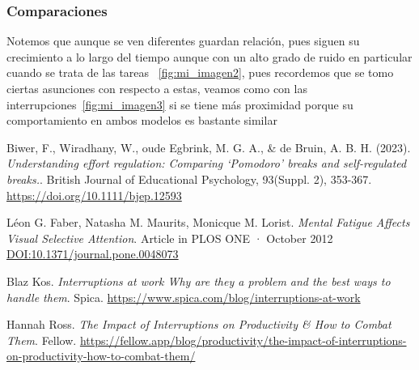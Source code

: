 \documentclass[10pt,a4paper,twocolumn]{article}
\begin{document}
\subsubsection*{Comparaciones}
Notemos que aunque se ven diferentes guardan relaci\'on, pues siguen su crecimiento a lo largo del tiempo aunque con un alto grado de ruido en particular cuando se trata de las tareas ~\ref{fig:mi_imagen2}, pues recordemos que se tomo ciertas asunciones con respecto a estas, veamos como con las interrupciones~\ref{fig:mi_imagen3} si se tiene m\'as proximidad porque su comportamiento en ambos modelos es bastante similar 

\begin{thebibliography}{9} 
     Biwer, F., Wiradhany, W., oude Egbrink, M. G. A., \& de Bruin, A. B. H. 
    (2023).
    \textit{Understanding effort regulation: Comparing ‘Pomodoro’ breaks and self-regulated breaks.}. British Journal of Educational Psychology, 93(Suppl. 2), 353-367. \href{https://doi.org/10.1111/bjep.12593}{https://doi.org/10.1111/bjep.12593}


     L\'eon G. Faber, Natasha M. Maurits, Monicque M. Lorist. 
    \textit{Mental Fatigue Affects Visual Selective Attention}. Article  in  PLOS ONE · October 2012 
    \href{DOI:10.1371/journal.pone.0048073}{DOI:10.1371/journal.pone.0048073}

     Blaz Kos. 
    \textit{Interruptions at work Why are they a problem and the best ways to handle them}. 
    Spica.
    \href{https://www.spica.com/blog/interruptions-at-work}{https://www.spica.com/blog/interruptions-at-work}

     Hannah Ross. 
    \textit{The Impact of Interruptions on Productivity \& How to Combat Them}.
    Fellow.
    \href{https://fellow.app/blog/productivity/the-impact-of-interruptions-on-productivity-how-to-combat-them/}{https://fellow.app/blog/productivity/the-impact-of-interruptions-on-productivity-how-to-combat-them/}

\end{thebibliography}
\end{document}
